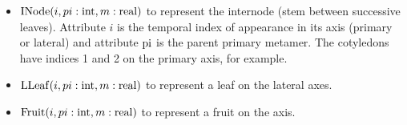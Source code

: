 \begin{itemize}
\item
  \(\mathrm{INode}(i,pi:\mathrm{int},m:\mathrm{real})\) to represent the
  internode (stem between successive leaves). Attribute \(i\) is the
  temporal index of appearance in its axis (primary or lateral) and
  attribute \(\mathrm{pi}\) is the parent primary metamer. The cotyledons
  have indices 1 and 2 on the primary axis, for example.
\item
  \(\mathrm{LLeaf}(i,pi:\mathrm{int},m:\mathrm{real})\) to represent a leaf on
  the lateral axes.
\item
  \(\mathrm{Fruit}(i,pi:\mathrm{int},m:\mathrm{real})\) to represent a fruit
  on the axis.
\end{itemize}

\begin{figure}[p]
\centering
{}
\end{figure}
